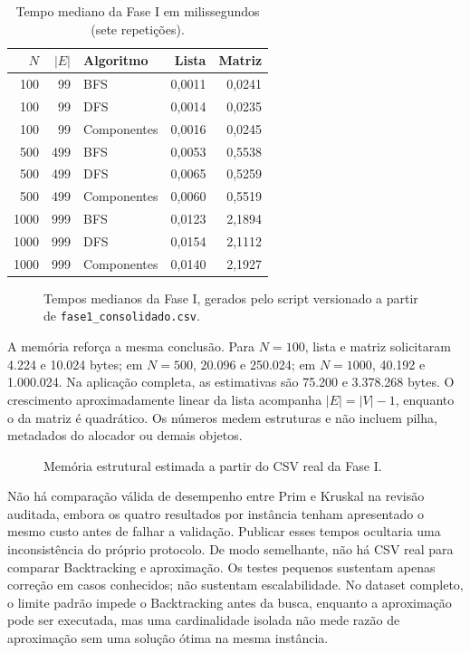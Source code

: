\documentclass[12pt]{article}
\begin{document}
\begin{table}[ht]
\centering
\caption{Tempo mediano da Fase I em milissegundos (sete repetições).}
\label{tab:tempo}
\small
\begin{tabular}{rrlrr}
\toprule
$N$ & $|E|$ & Algoritmo & Lista & Matriz \\
\midrule
100  & 99  & BFS         & 0,0011 & 0,0241 \\
100  & 99  & DFS         & 0,0014 & 0,0235 \\
100  & 99  & Componentes & 0,0016 & 0,0245 \\
500  & 499 & BFS         & 0,0053 & 0,5538 \\
500  & 499 & DFS         & 0,0065 & 0,5259 \\
500  & 499 & Componentes & 0,0060 & 0,5519 \\
1000 & 999 & BFS         & 0,0123 & 2,1894 \\
1000 & 999 & DFS         & 0,0154 & 2,1112 \\
1000 & 999 & Componentes & 0,0140 & 2,1927 \\
\bottomrule
\end{tabular}
\end{table}

\begin{figure}[ht]
\centering

\caption{Tempos medianos da Fase I, gerados pelo script versionado a partir de \texttt{fase1\_consolidado.csv}.}
\label{fig:tempo}
\end{figure}

A memória reforça a mesma conclusão. Para $N=100$, lista e matriz solicitaram 4.224 e 10.024 bytes; em $N=500$, 20.096 e 250.024; em $N=1000$, 40.192 e 1.000.024. Na aplicação completa, as estimativas são 75.200 e 3.378.268 bytes. O crescimento aproximadamente linear da lista acompanha $|E|=|V|-1$, enquanto o da matriz é quadrático. Os números medem estruturas e não incluem pilha, metadados do alocador ou demais objetos.

\begin{figure}[ht]
\centering

\caption{Memória estrutural estimada a partir do CSV real da Fase I.}
\label{fig:memoria}
\end{figure}

Não há comparação válida de desempenho entre Prim e Kruskal na revisão auditada, embora os quatro resultados por instância tenham apresentado o mesmo custo antes de falhar a validação. Publicar esses tempos ocultaria uma inconsistência do próprio protocolo. De modo semelhante, não há CSV real para comparar Backtracking e aproximação. Os testes pequenos sustentam apenas correção em casos conhecidos; não sustentam escalabilidade. No dataset completo, o limite padrão impede o Backtracking antes da busca, enquanto a aproximação pode ser executada, mas uma cardinalidade isolada não mede razão de aproximação sem uma solução ótima na mesma instância.
\end{document}
